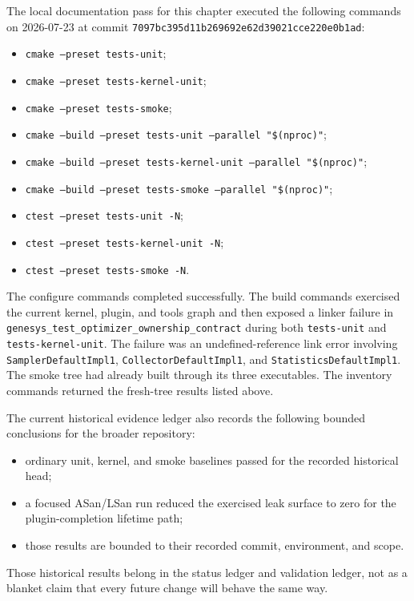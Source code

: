 The local documentation pass for this chapter executed the following commands
on 2026-07-23 at commit \texttt{7097bc395d11b269692e62d39021cce220e0b1ad}:
\begin{itemize}
\item \texttt{cmake --preset tests-unit};
\item \texttt{cmake --preset tests-kernel-unit};
\item \texttt{cmake --preset tests-smoke};
\item \texttt{cmake --build --preset tests-unit --parallel "\$(nproc)"};
\item \texttt{cmake --build --preset tests-kernel-unit --parallel "\$(nproc)"};
\item \texttt{cmake --build --preset tests-smoke --parallel "\$(nproc)"};
\item \texttt{ctest --preset tests-unit -N};
\item \texttt{ctest --preset tests-kernel-unit -N};
\item \texttt{ctest --preset tests-smoke -N}.
\end{itemize}

The configure commands completed successfully. The build commands exercised the
current kernel, plugin, and tools graph and then exposed a linker failure in
\texttt{genesys\_test\_optimizer\_ownership\_contract} during both
\texttt{tests-unit} and \texttt{tests-kernel-unit}. The failure was an
undefined-reference link error involving
\texttt{SamplerDefaultImpl1},
\texttt{CollectorDefaultImpl1}, and
\texttt{StatisticsDefaultImpl1}. The smoke tree had already built through its
three executables. The inventory commands returned the fresh-tree results
listed above.

The current historical evidence ledger also records the following bounded
conclusions for the broader repository:
\begin{itemize}
\item ordinary unit, kernel, and smoke baselines passed for the recorded
historical head;
\item a focused ASan/LSan run reduced the exercised leak surface to zero for
the plugin-completion lifetime path;
\item those results are bounded to their recorded commit, environment, and
scope.
\end{itemize}

Those historical results belong in the status ledger and validation ledger, not
as a blanket claim that every future change will behave the same way.

